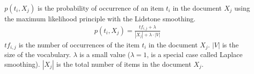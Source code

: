 \begin{definition}
  $p(t_i, X_j)$ is the probability of occurrence of an item $t_i$ in the document $X_j$ using the maximum likelihood principle with the Lidstone smoothing.
  \begin{gather*}
    p(t_i, X_j) = \frac{tf_{i,j} + \lambda}{|X_j| + \lambda \cdot |V|}
  \end{gather*}
  $tf_{i,j}$ is the number of occurrences of the item $t_i$ in the document $X_j$.
  $|V|$ is the size of the vocabulary.
  $\lambda$ is a small value ($\lambda = 1$, is a special case called Laplace smoothing).
  $|X_j|$ is the total number of items in the document $X_j$.
\end{definition}
